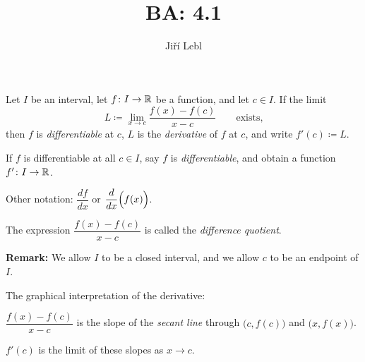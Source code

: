 \documentclass[10pt,aspectratio=169]{beamer}
\author{Ji\v{r}\'i Lebl}
\institute[OSU]{%
Departemento pri Matematiko de Oklahoma {\^S}tata Universitato}
\title{BA: 4.1}
\date{}
\begin{document}
\begin{frame}
\titlepage
\end{frame}

\begin{frame}
\begin{definition}
Let $I$ be an interval, let
$f \colon I \to {\mathbb{R}}$ be a function, and let $c \in I$.
\pause
If the limit
\begin{equation*}
L \coloneqq \lim_{x \to c} \frac{f(x)-f(c)}{x-c} \qquad \text{exists,}
\end{equation*}
\pause
then $f$ is
\emph{differentiable} at
$c$, $L$ is the \emph{derivative} of $f$ at $c$,
and write $f'(c) \coloneqq L$.

\pause
\medskip

If $f$ is differentiable at all $c \in I$, say
$f$ is \emph{differentiable},
and obtain a function $f' \colon I \to {\mathbb{R}}$.

\pause
\medskip

Other notation: $\dfrac{df}{dx}$ or $\dfrac{d}{dx}\Bigl( f(x) \Bigr)$.

\pause
\medskip

The expression $\dfrac{f(x)-f(c)}{x-c}$ is called the
\emph{difference quotient}.
\end{definition}

\pause
\textbf{Remark:}
We allow $I$ to be a closed interval,
and we allow $c$ to be an endpoint of $I$.

\end{frame}

\begin{frame}
The graphical interpretation of the derivative:

\medskip

\begin{center}
\end{center}

\pause
\medskip

$\dfrac{f(x)-f(c)}{x-c}$ is the slope of the \emph{secant line}
through $\bigl(c,f(c)\bigr)$ and $\bigl(x,f(x)\bigr)$.

\pause
\medskip

$f'(c)$ is the limit of these slopes as $x \to c$.

\end{frame}
\end{document}
